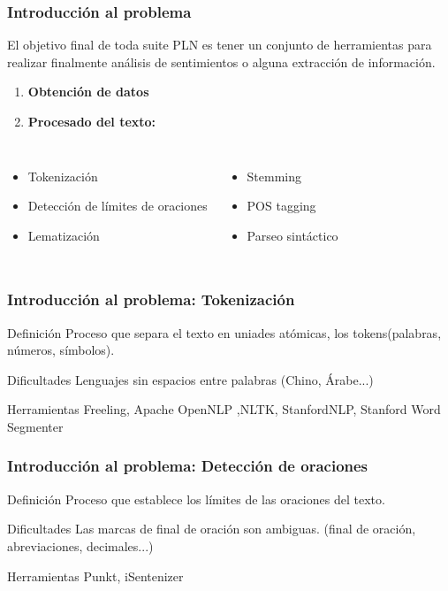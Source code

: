 \documentclass{beamer}
\begin{document}
\begin{frame}
\frametitle{Introducción al problema}
El objetivo final de toda suite PLN es tener un conjunto de herramientas para realizar finalmente análisis de sentimientos o alguna extracción de información.
\begin{enumerate}
\item \textbf{Obtención de datos}
\item \textbf{Procesado del texto:}
\end{enumerate}
\begin{columns}[c]
\begin{itemize}
\item Tokenización
\item Detección de límites de oraciones
\item Lematización
\end{itemize}
\begin{itemize}
\item Stemming
\item POS tagging
\item Parseo sintáctico
\end{itemize}
\end{columns}
\end{frame}

\begin{frame}
\frametitle{Introducción al problema: Tokenización}
\begin{block}{Definición}
Proceso que separa el texto en uniades atómicas, los tokens(palabras, números, símbolos).
\end{block}
\begin{block}{Dificultades}
Lenguajes sin espacios entre palabras (Chino, Árabe...)
\end{block}
\begin{block}{Herramientas}
Freeling, Apache OpenNLP ,NLTK, StanfordNLP, Stanford Word Segmenter
\end{block}
\end{frame}

\begin{frame}
\frametitle{Introducción al problema: Detección de oraciones}
\begin{block}{Definición}
Proceso que establece los límites de las oraciones del texto.
\end{block}
\begin{block}{Dificultades}
Las marcas de final de oración son ambiguas. (final de oración, abreviaciones, decimales...)
\end{block}
\begin{block}{Herramientas}
Punkt, iSentenizer
\end{block}
\end{frame}
\end{document}

